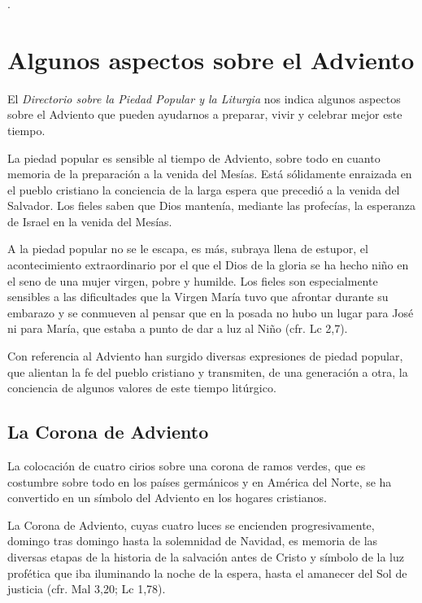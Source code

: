 \begin{introstyle}
	.
	
	\section{Algunos aspectos sobre el Adviento}
	
	El \emph{Directorio sobre la Piedad Popular y la Liturgia} nos indica algunos aspectos sobre el Adviento que pueden ayudarnos a preparar, vivir y celebrar mejor este tiempo\label{fn8}.
	
	La piedad popular es sensible al tiempo de Adviento, sobre todo en cuanto memoria de la preparación a la venida del Mesías. Está sólidamente enraizada en el pueblo cristiano la conciencia de la larga espera que precedió a la venida del Salvador. Los fieles saben que Dios mantenía, mediante las profecías, la esperanza de Israel en la venida del Mesías.
	
	A la piedad popular no se le escapa, es más, subraya llena de estupor, el acontecimiento extraordinario por el que el Dios de la gloria se ha hecho niño en el seno de una mujer virgen, pobre y humilde. Los fieles son especialmente sensibles a las dificultades que la Virgen María tuvo que afrontar durante su embarazo y se conmueven al pensar que en la posada no hubo un lugar para José ni para María, que estaba a punto de dar a luz al Niño (cfr. Lc 2,7).
	
	Con referencia al Adviento han surgido diversas expresiones de piedad popular, que alientan la fe del pueblo cristiano y transmiten, de una generación a otra, la conciencia de algunos valores de este tiempo litúrgico.
	
	\subsection{La Corona de Adviento}
	
	La colocación de cuatro cirios sobre una corona de ramos verdes, que es costumbre sobre todo en los países germánicos y en América del Norte, se ha convertido en un símbolo del Adviento en los hogares cristianos.
	
	La Corona de Adviento, cuyas cuatro luces se encienden progresivamente, domingo tras domingo hasta la solemnidad de Navidad, es memoria de las diversas etapas de la historia de la salvación antes de Cristo y símbolo de la luz profética que iba iluminando la noche de la espera, hasta el amanecer del Sol de justicia (cfr. Mal 3,20; Lc 1,78).
	

\end{introstyle}
